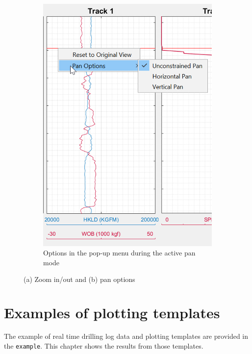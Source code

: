 \documentclass[12pt,a4paper,oneside]{report}
\begin{document}
\begin{figure}[ht]
\begin{subfigure}[b]{0.45\textwidth}
    \includegraphics[width=\textwidth]{pan.png}
    \caption{Options in the pop-up menu during the active pan mode}
  \end{subfigure}
\caption{(a) Zoom in/out and (b) pan options}
\end{figure}

\chapter{Examples of plotting templates}
The example of real time drilling log data and plotting templates are provided in the \texttt{example}. This chapter shows the results from those templates.
\end{document}
